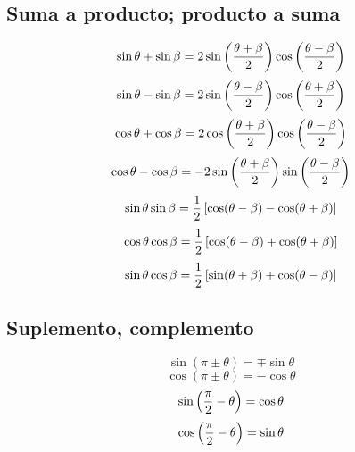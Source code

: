 \documentclass[
	12pt, %
	fleqn, %
	a4paper, %
	oneside, %
]{LegrandOrangeBook}
\begin{document}
\subsection{Suma a producto; producto a suma}
\begin{equation}
\sin\theta+\sin\beta=2\sin\left(\frac{\theta+\beta}{2}\right)\cos\left(\frac{\theta-\beta}{2}\right)
\end{equation}
\begin{equation}
\sin\theta-\sin\beta=2\sin\left(\frac{\theta-\beta}{2}\right)\cos\left(\frac{\theta+\beta}{2}\right)
\end{equation}
\begin{equation}
\cos\theta+\cos\beta=2\cos\left(\frac{\theta+\beta}{2}\right)\cos\left(\frac{\theta-\beta}{2}\right)
\end{equation}
\begin{equation}
\cos\theta-\cos\beta=-2\sin\left(\frac{\theta+\beta}{2}\right)\sin\left(\frac{\theta-\beta}{2}\right)
\end{equation}
\begin{equation}
\sin\theta\sin\beta=\frac{1}{2}\left[\cos(\theta-\beta)-\cos(\theta+\beta)\right]
\end{equation}
\begin{equation}
\cos\theta\cos\beta=\frac{1}{2}\left[\cos(\theta-\beta)+\cos(\theta+\beta)\right]
\end{equation}
\begin{equation}
\sin\theta\cos\beta=\frac{1}{2}\left[\sin(\theta+\beta)+\cos(\theta-\beta)\right]
\end{equation}
\subsection{Suplemento, complemento}
\begin{multicols}{2}
\begin{equation}
\sin(\pi\pm\theta)=\mp\sin\theta
\end{equation}
\begin{equation}
\cos(\pi\pm\theta)=-\cos\theta
\end{equation}
\begin{equation}
\sin\left(\frac{\pi}{2}-\theta\right)=\cos\theta
\end{equation}
\begin{equation}
\cos\left(\frac{\pi}{2}-\theta\right)=\sin\theta
\end{equation}
\end{multicols}
\end{document}
